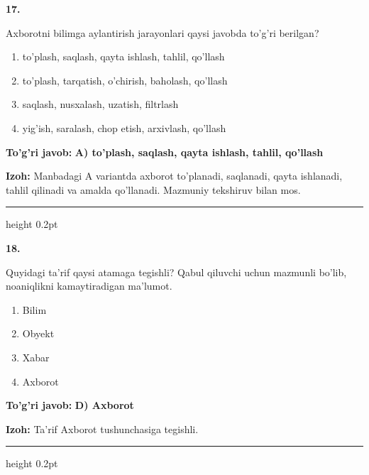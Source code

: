 \documentclass[10pt,a4paper,oneside]{article}
\begin{document}
\noindent\textbf{\color{ink}17.}
\par
Axborotni bilimga aylantirish jarayonlari qaysi javobda to'g'ri berilgan?
\begin{enumerate}[label=\Alph*),leftmargin=9mm]
\item to'plash, saqlash, qayta ishlash, tahlil, qo'llash
\item to'plash, tarqatish, o'chirish, baholash, qo'llash
\item saqlash, nusxalash, uzatish, filtrlash
\item yig'ish, saralash, chop etish, arxivlash, qo'llash
\end{enumerate}
\begin{tcolorbox}[enhanced,breakable,colback=teal!4,colframe=teal!50!black,boxrule=0.5pt,arc=1.1mm,left=3mm,right=3mm,top=1.7mm,bottom=1.7mm,before skip=2mm,after skip=2mm]
\textbf{\color{teal}To'g'ri javob:} \textbf{A) to'plash, saqlash, qayta ishlash, tahlil, qo'llash}
\par\smallskip
\textbf{Izoh:} Manbadagi A variantda axborot to'planadi, saqlanadi, qayta ishlanadi, tahlil qilinadi va amalda qo'llanadi. Mazmuniy tekshiruv bilan mos.
\end{tcolorbox}
\vspace{2mm}\hrule height 0.2pt \vspace{3mm}

\noindent\textbf{\color{ink}18.}
\par
Quyidagi ta'rif qaysi atamaga tegishli? Qabul qiluvchi uchun mazmunli bo'lib, noaniqlikni kamaytiradigan ma'lumot.
\begin{enumerate}[label=\Alph*),leftmargin=9mm]
\item Bilim
\item Obyekt
\item Xabar
\item Axborot
\end{enumerate}
\begin{tcolorbox}[enhanced,breakable,colback=teal!4,colframe=teal!50!black,boxrule=0.5pt,arc=1.1mm,left=3mm,right=3mm,top=1.7mm,bottom=1.7mm,before skip=2mm,after skip=2mm]
\textbf{\color{teal}To'g'ri javob:} \textbf{D) Axborot}
\par\smallskip
\textbf{Izoh:} Ta'rif Axborot tushunchasiga tegishli.
\end{tcolorbox}
\vspace{2mm}\hrule height 0.2pt \vspace{3mm}
\end{document}
